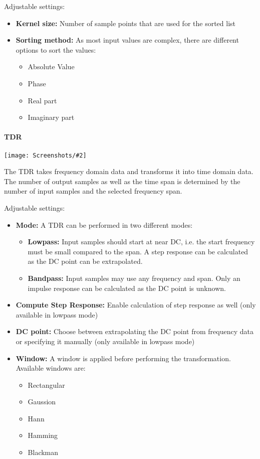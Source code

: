 \documentclass[a4paper,11pt]{article}
\newcommand{\screenshot}[2]{\begin{center}
\texttt{[image: Screenshots/\#2]}
\end{center}}
\begin{document}
Adjustable settings:
\begin{itemize}
\item \textbf{Kernel size:} Number of sample points that are used for the sorted list
\item \textbf{Sorting method:} As most input values are complex, there are different options to sort the values:
\begin{itemize}
\item Absolute Value
\item Phase
\item Real part
\item Imaginary part
\end{itemize}
\end{itemize}
\paragraph{TDR}
\screenshot{0.4}{MathOpTDR.png}
The TDR takes frequency domain data and transforms it into time domain data. The number of output samples as well as the time span is determined by the number of input samples and the selected frequency span.

Adjustable settings:
\begin{itemize}
\item \textbf{Mode:} A TDR can be performed in two different modes:
\begin{itemize}
\item \textbf{Lowpass:} Input samples should start at near DC, i.e. the start frequency must be small compared to the span. A step response can be calculated as the DC point can be extrapolated.
\item \textbf{Bandpass:} Input samples may use any frequency and span. Only an impulse response can be calculated as the DC point is unknown.
\end{itemize}
\item \textbf{Compute Step Response:} Enable calculation of step response as well (only available in lowpass mode)
\item \textbf{DC point:} Choose between extrapolating the DC point from frequency data or specifying it manually (only available in lowpass mode)
\item \textbf{Window:} A window is applied before performing the transformation. Available windows are:
\begin{itemize}
\item Rectangular
\item Gaussion
\item Hann
\item Hamming
\item Blackman
\end{itemize}
\end{itemize}
\end{document}
